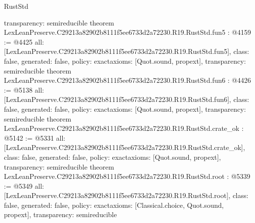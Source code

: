 \begin{lexlean}{RustStd}
\begin{coremodule}
{  transparency: semireducible
}
theorem LexLeanPreserve.C29213a82902b8111f5ee6733d2a72230.R19.RustStd.fun5 : @4159 := @4425 {
  all: [LexLeanPreserve.C29213a82902b8111f5ee6733d2a72230.R19.RustStd.fun5],
  class: false,
  generated: false,
  policy: exact{axioms: [Quot.sound, propext]},
  transparency: semireducible
}
theorem LexLeanPreserve.C29213a82902b8111f5ee6733d2a72230.R19.RustStd.fun6 : @4426 := @5138 {
  all: [LexLeanPreserve.C29213a82902b8111f5ee6733d2a72230.R19.RustStd.fun6],
  class: false,
  generated: false,
  policy: exact{axioms: [Quot.sound, propext]},
  transparency: semireducible
}
theorem LexLeanPreserve.C29213a82902b8111f5ee6733d2a72230.R19.RustStd.crate_ok : @5142 := @5331 {
  all: [LexLeanPreserve.C29213a82902b8111f5ee6733d2a72230.R19.RustStd.crate_ok],
  class: false,
  generated: false,
  policy: exact{axioms: [Quot.sound, propext]},
  transparency: semireducible
}
theorem LexLeanPreserve.C29213a82902b8111f5ee6733d2a72230.R19.RustStd.root : @5339 := @5349 {
  all: [LexLeanPreserve.C29213a82902b8111f5ee6733d2a72230.R19.RustStd.root],
  class: false,
  generated: false,
  policy: exact{axioms: [Classical.choice, Quot.sound, propext]},
  transparency: semireducible
}


\end{coremodule}
\end{lexlean}
